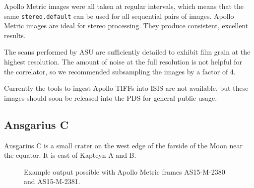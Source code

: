 Apollo Metric images were all taken at regular intervals, which means
that the same \texttt{stereo.default} can be used for all sequential pairs of
images. Apollo Metric images are ideal for stereo processing.  They
produce consistent, excellent results.

The scans performed by ASU are sufficiently detailed to exhibit film
grain at the highest resolution.  The amount of noise at the full
resolution is not helpful for the correlator, so we recommended
subsampling the images by a factor of 4.

Currently the tools to ingest Apollo TIFFs into ISIS are not
available, but these images should soon be released into the PDS for
general public usage.

\subsection{Ansgarius C}

Ansgarius C is a small crater on the west edge of the farside of the
Moon near the equator. It is east of Kapteyn A and B.

\begin{figure}[h!]
\centering
  \hfil
\caption{Example output possible with Apollo Metric frames AS15-M-2380 and AS15-M-2381.}
\label{fig:metric_example}
\end{figure}

